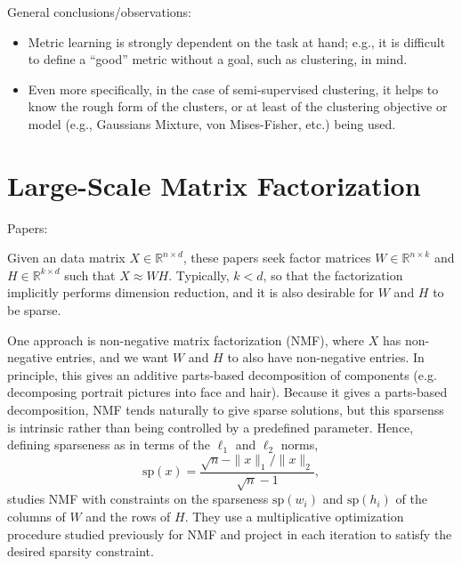\documentclass{article} %
\newcommand{\R}{\mathbb{R}}                         %
\begin{document}
% 
General conclusions/observations:
\begin{itemize}
\item Metric learning is strongly dependent on the task at hand; e.g., it is
difficult to define a ``good'' metric without a goal, such as clustering, in
mind.
\item Even more specifically, in the case of semi-supervised clustering, it
helps to know the rough form of the clusters, or at least of the clustering
objective or model (e.g., Gaussians Mixture, von Mises-Fisher, etc.) being
used.
\end{itemize}


\section{Large-Scale Matrix Factorization}
Papers:
    \cite{hoyer04NMFwithsparseness,
          jenatton10structuredsparsePCA,
          gemulla11matrixfactorization}

Given an data matrix $X \in \R^{n \times d}$, these papers seek factor
matrices $W \in \R^{n \times k}$ and $H \in \R^{k \times d}$ such that
$X \approx WH$. Typically, $k < d$, so that the factorization implicitly
performs dimension reduction, and it is also desirable for $W$ and $H$ to be
sparse.

One approach is non-negative matrix factorization (NMF), where $X$ has
non-negative entries, and we want $W$ and $H$ to also have non-negative
entries. In principle, this gives an additive parts-based decomposition of
components (e.g. decomposing portrait pictures into face and hair). Because it
gives a parts-based decomposition, NMF tends naturally to give sparse
solutions, but this sparsenss is intrinsic rather than being controlled by a
predefined parameter. Hence, defining sparseness as in terms of the $\ell_1$
and $\ell_2$ norms,
\[\text{sp}(x) = \frac{\sqrt{n} - \|x\|_1/\|x\|_2}{\sqrt{n} - 1},\]
\cite{hoyer04NMFwithsparseness} studies NMF with constraints on the sparseness
$\text{sp}(w_i)$ and $\text{sp}(h_i)$ of the columns of $W$ and the rows of
$H$. They use a multiplicative optimization procedure studied previously for
NMF and project in each iteration to satisfy the desired sparsity constraint.
\end{document}
